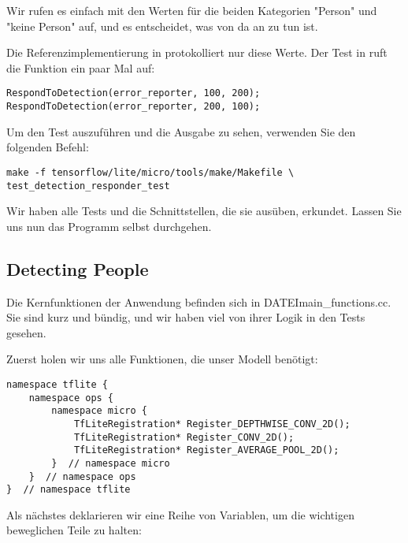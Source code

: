 Wir rufen es einfach mit den Werten für die beiden Kategorien "Person" und "keine Person" auf, und es entscheidet, was von da an zu tun ist.

Die Referenzimplementierung in  protokolliert nur diese Werte. Der Test in  ruft die Funktion ein paar Mal auf:

\begin{code}
    \begin{lstlisting}
RespondToDetection(error_reporter, 100, 200);
RespondToDetection(error_reporter, 200, 100);
  \end{lstlisting}
\end{code}

Um den Test auszuführen und die Ausgabe zu sehen, verwenden Sie den folgenden Befehl:

\begin{code}
    \begin{lstlisting}
make -f tensorflow/lite/micro/tools/make/Makefile \
test_detection_responder_test
  \end{lstlisting}
\end{code}

Wir haben alle Tests und die Schnittstellen, die sie ausüben, erkundet. Lassen Sie uns nun das Programm selbst durchgehen.

\subsection{Detecting People}

Die Kernfunktionen der Anwendung befinden sich in DATEI{main\_functions.cc}. Sie sind kurz und bündig, und wir haben viel von ihrer Logik in den Tests gesehen.

Zuerst holen wir uns alle Funktionen, die unser Modell benötigt:

\begin{code}
    \begin{lstlisting}
namespace tflite {
    namespace ops {
        namespace micro {
            TfLiteRegistration* Register_DEPTHWISE_CONV_2D();
            TfLiteRegistration* Register_CONV_2D();
            TfLiteRegistration* Register_AVERAGE_POOL_2D();
        }  // namespace micro
    }  // namespace ops
}  // namespace tflite
  \end{lstlisting}
\end{code}

Als nächstes deklarieren wir eine Reihe von Variablen, um die wichtigen beweglichen Teile zu halten:

